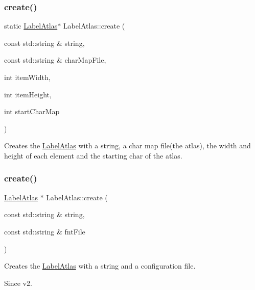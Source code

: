 \subsubsection{\texorpdfstring{create()}{create()}\hspace{0.1cm}{\footnotesize\ttfamily [4/6]}}
{\footnotesize\ttfamily static \hyperlink{classLabelAtlas}{Label\+Atlas}$\ast$ Label\+Atlas\+::create (\begin{DoxyParamCaption}\item[{const std\+::string \&}]{string,  }\item[{const std\+::string \&}]{char\+Map\+File,  }\item[{int}]{item\+Width,  }\item[{int}]{item\+Height,  }\item[{int}]{start\+Char\+Map }\end{DoxyParamCaption})\hspace{0.3cm}{\ttfamily [static]}}

Creates the \hyperlink{classLabelAtlas}{Label\+Atlas} with a string, a char map file(the atlas), the width and height of each element and the starting char of the atlas. \mbox{\label{classLabelAtlas_a082db7324aa50be920b7d014a8b1c1ef}} 
\subsubsection{\texorpdfstring{create()}{create()}\hspace{0.1cm}{\footnotesize\ttfamily [5/6]}}
{\footnotesize\ttfamily \hyperlink{classLabelAtlas}{Label\+Atlas} $\ast$ Label\+Atlas\+::create (\begin{DoxyParamCaption}\item[{const std\+::string \&}]{string,  }\item[{const std\+::string \&}]{fnt\+File }\end{DoxyParamCaption})\hspace{0.3cm}{\ttfamily [static]}}

Creates the \hyperlink{classLabelAtlas}{Label\+Atlas} with a string and a configuration file. \begin{DoxySince}{Since}
v2. 
\end{DoxySince}
\mbox{\label{classLabelAtlas_ae5538d5f76f507618714b681c4d90caa}} 
